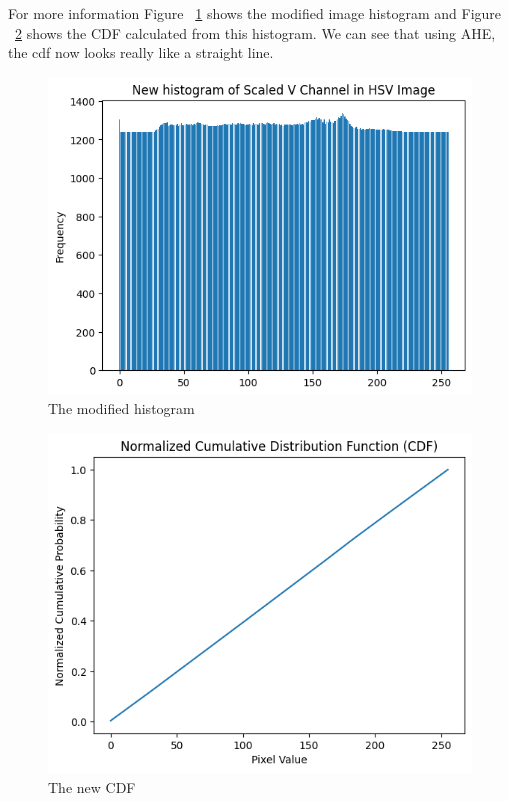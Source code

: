 \documentclass{article}
\begin{document}
	For more information Figure ~\ref{fig:AHE_histo} shows the modified image histogram and Figure ~\ref{fig:AHE_cdf} shows the CDF calculated from this histogram. We can see that using AHE, the cdf now looks really like a straight line.
	
	\begin{figure}[!h]
		\includegraphics[width=\linewidth]{img/AHE_histo.png}
		\caption{The modified histogram}
		\label{fig:AHE_histo}
	\end{figure}
	
	\begin{figure}[!h]
		\includegraphics[width=\linewidth]{img/AHE_cdf.png}
		\caption{The new CDF}
		\label{fig:AHE_cdf}
	\end{figure}
	
\end{document}

